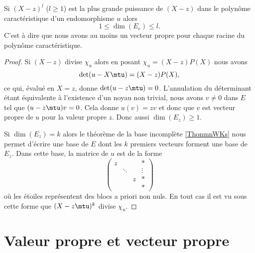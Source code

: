 \begin{proposition}\label{PropooBYZCooBmYLSc}
    Si \( (X-z)^l\) (\( l\geq 1\)) est la plus grande puissance de \( (X-z)\) dans le polynôme caractéristique d'un endomorphisme \( u\) alors 
    \begin{equation}
        1\leq \dim(E_e)\leq l.
    \end{equation}
    C'est à dire que nous avons au moins un vecteur propre pour chaque racine du polynôme caractéristique.
\end{proposition}

\begin{proof}
    Si $(X-z)$ divise \( \chi_u\) alors en posant \( \chi_u=(X-z)P(X)\) nous avons
    \begin{equation}
        \det(u-X\mtu)=(X-z)P(X),
    \end{equation}
    ce qui, évalué en \( X=z\), donne \( \det(u-z\mtu)=0\). L'annulation du déterminant étant équivalente à l'existence d'un noyau non trivial, nous avons \( v\neq 0\) dans \( E\) tel que \( (u-z\mtu)v=0\). Cela donne \( u(v)=zv\) et donc que \( v\) est vecteur propre de \( u\) pour la valeur propre \( z\). Donc aussi \( \dim(E_z)\geq 1\).

    Si \( \dim(E_z)=k\) alors le théorème de la base incomplète \ref{ThonmnWKs} nous permet d'écrire une base de \( E\) dont les \( k\) premiers vecteurs forment une base de \( E_z\). Dans cette base, la matrice de \( u\) est de la forme
    \begin{equation}
        \begin{pmatrix}
             z   &       &       &   *    \\
                &   \ddots    &       &   \vdots    \\
                &       &   z    &   *    \\ 
                &       &       &   *     
         \end{pmatrix}
    \end{equation}
    où les étoiles représentent des blocs a priori non nuls. En tout cas il est vu sous cette forme que \( (X-z\mtu)^k\) divise \( \chi_u\).
\end{proof}

\section{Valeur propre et vecteur propre}


